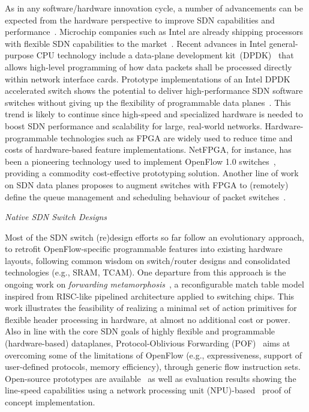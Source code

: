 As in any soft\-wa\-re/hard\-wa\-re innovation cycle, a number of advancements can be expected from the hardware 
perspective to improve SDN capabilities and performance~\cite{intelprocessors2012,brebner2012,appelman2012,matsumoto2012,naous2008,bianco2010}.
Microchip companies such as Intel are already shipping processors with flexible SDN capabilities to the 
market~\cite{intelprocessors2012}. Recent advances in Intel general-purpose CPU technology include a 
data-plane development kit~(DPDK)~\cite{intelcorporation2014} that allows high-level programming of how data 
packets shall be processed directly within network interface cards. Prototype implementations of an Intel 
DPDK accelerated switch shows the potential to deliver high-performance SDN software switches without 
giving up the flexibility of programmable data planes~\cite{pongracz2013}. This trend is likely to 
continue since high-speed and specialized hardware is needed to boost SDN performance and scalability for 
large, real-world networks. Hardware-programmable technologies such as FPGA are widely used to reduce time 
and costs of hardware-based feature implementations. NetFPGA, for instance, has been a pioneering technology 
used to implement OpenFlow 1.0 switches~\cite{naous2008}, providing a commodity 
cost-effective prototyping solution. Another line of work on SDN data planes proposes to augment switches 
with FPGA to (remotely) define the queue management and scheduling behaviour of packet 
switches~\cite{sivaraman2013}.

\vspace{2mm}
\noindent \textit{Native SDN Switch Designs}

Most of the SDN switch (re)design efforts so far follow an evolutionary approach, to retrofit 
OpenFlow-specific programmable features into existing hardware layouts, following common wisdom 
on switch/router designs and consolidated technologies (e.g., SRAM, TCAM). One departure from 
this approach is the ongoing work on \textit{forwarding metamorphosis}~\cite{bosshart2013-1}, 
a reconfigurable match table model inspired from RISC-like pipelined architecture applied to switching 
chips. This work illustrates the feasibility of realizing a minimal set of action primitives for flexible 
header processing in hardware, at almost no additional cost or power. Also in line with the core SDN goals 
of highly flexible and programmable (hardware-based) dataplanes, Protocol-Oblivious Forwarding (POF)~\cite{song2013-1} aims at overcoming some of the limitations of OpenFlow (e.g., expressiveness, 
support of user-defined protocols, memory efficiency), through generic flow instruction sets.
Open-source prototypes are available~\cite{song2013} as well as evaluation 
results showing the line-speed capabilities using a network processing unit (NPU)-based~\cite{Hauger2009} proof of 
concept implementation. 


